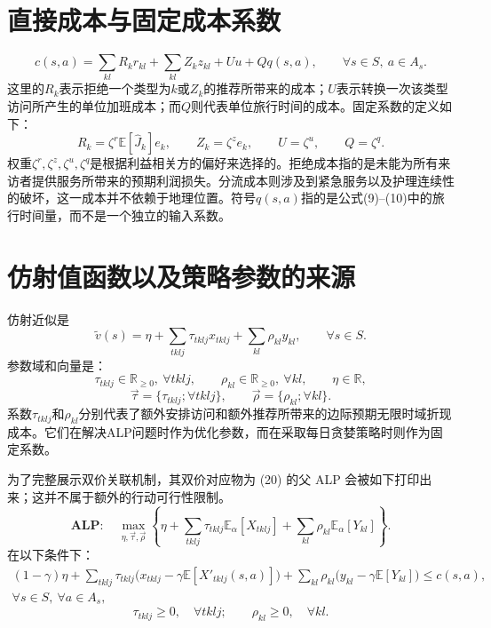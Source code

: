 \documentclass{article}
\begin{document}
\section*{直接成本与固定成本系数}
\begin{equation}
c(s,a)=\sum_{kl}R_kr_{kl}+\sum_{kl}Z_kz_{kl}+Uu+Qq(s,a),
\qquad\forall s\in S,\ a\in A_s.
\tag{14}
\end{equation}
这里的$R_k$表示拒绝一个类型为$k$或$Z_k$的推荐所带来的成本；$U$表示转换一次该类型访问所产生的单位加班成本；而$Q$则代表单位旅行时间的成本。固定系数的定义如下：
\[
R_k=\zeta^r\mathbb E[\hat J_k]e_k,\qquad
Z_k=\zeta^z e_k,\qquad
U=\zeta^u,\qquad Q=\zeta^q.
\]
权重$\zeta^r,\zeta^z,\zeta^u,\zeta^q$是根据利益相关方的偏好来选择的。拒绝成本指的是未能为所有来访者提供服务所带来的预期利润损失。分流成本则涉及到紧急服务以及护理连续性的破坏，这一成本并不依赖于地理位置。符号$q(s,a)$指的是公式(9)--(10)中的旅行时间量，而不是一个独立的输入系数。

\section*{仿射值函数以及策略参数的来源}
仿射近似是
\begin{equation}
\widetilde v(s)=\eta+\sum_{tklj}\tau_{tklj}x_{tklj}+\sum_{kl}\rho_{kl}y_{kl},
\qquad\forall s\in S.
\tag{17}
\end{equation}
参数域和向量是：
\[
\tau_{tklj}\in\mathbb R_{\geq0},\ \forall tklj,\qquad
\rho_{kl}\in\mathbb R_{\geq0},\ \forall kl,\qquad
\eta\in\mathbb R,
\]
\[
\vec\tau=\{\tau_{tklj};\forall tklj\},\qquad
\vec\rho=\{\rho_{kl};\forall kl\}.
\]
系数$\tau_{tklj}$和$\rho_{kl}$分别代表了额外安排访问和额外推荐所带来的边际预期无限时域折现成本。它们在解决ALP问题时作为优化参数，而在采取每日贪婪策略时则作为固定系数。

为了完整展示双价关联机制，其双价对应物为 (20) 的父 ALP 会被如下打印出来；这并不属于额外的行动可行性限制。
\begin{equation}
\mathbf{ALP}:\quad
\max_{\eta,\vec\tau,\vec\rho}
\left\{\eta+\sum_{tklj}\tau_{tklj}\mathbb E_\alpha[X_{tklj}]
+\sum_{kl}\rho_{kl}\mathbb E_\alpha[Y_{kl}]\right\}.
\tag{18a}
\end{equation}
在以下条件下：
\begin{equation}
\begin{split}
(1-\gamma)\eta
+\sum_{tklj}\tau_{tklj}\bigl(x_{tklj}-\gamma\mathbb E[X'_{tklj}(s,a)]\bigr)
+\sum_{kl}\rho_{kl}\bigl(y_{kl}-\gamma\mathbb E[Y_{kl}]\bigr)
\leq c(s,a),\\
\forall s\in S,\ \forall a\in A_s,
\end{split}
\tag{18b}
\end{equation}
\begin{equation}
\tau_{tklj}\geq0,\quad\forall tklj;\qquad
\rho_{kl}\geq0,\quad\forall kl.
\tag{18c}
\end{equation}
\end{document}
